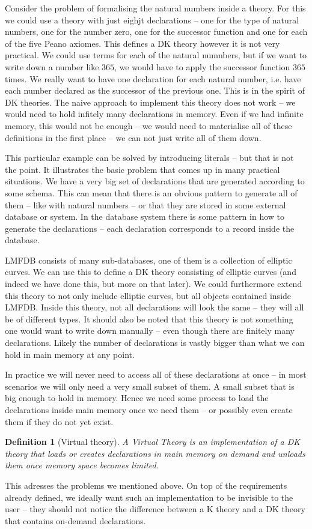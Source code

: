 \documentclass{deliverablereport}
\newtheorem{mydef}{Definition}
\begin{document}
Consider the problem of formalising the natural numbers inside a theory. For this we could use a theory with just eighjt declarations -- one for the type of natural numbers, one for the number zero, one for the successor function and one for each of the five Peano axiomes. This defines a DK theory however it is not very practical. We could use terms for each of the natural numnbers, but if we want to write down a number like $365$, we would have to apply the successor function $365$ times. We really want to have one declaration for each natural number, i.e. have each number declared as the successor of the previous one. This is in the spirit of DK theories. The naive approach to implement this theory does not work -- we would need to hold infitely many declarations in memory. Even if we had infinite memory, this would not be enough -- we would need to materialise all of these definitions in the first place -- we can not just write all of them down.

This particular example can be solved by introducing literals -- but that is not the point. It illustrates the basic problem that comes up in many practical situations. We have a very big set of declarations that are generated according to some schema. This can mean that there is an obvious pattern to generate all of them -- like with natural numbers -- or that they are stored in some external database or system. In the database system there is some pattern in how to generate the declarations -- each declaration corresponds to a record inside the database.

LMFDB consists of many sub-databases, one of them is a collection of elliptic curves. We can use this to define a DK theory consisting of elliptic curves (and indeed we have done this, but more on that later). We could furthermore extend this theory to not only include elliptic curves, but all objects contained inside LMFDB. Inside this theory, not all declarations will look the same -- they will all be of different types. It should also be noted that this theory is not something one would want to write down manually -- even though there are finitely many declarations. Likely the number of declarations is vastly bigger than what we can hold in main memory at any point.

In practice we will never need to access all of these declarations at once -- in most scenarios we will only need a very small subset of them. A small subset that is big enough to hold in memory. Hence we need some process to load the declarations inside main memory once we need them -- or possibly even create them if they do not yet exist.
\begin{mydef}[Virtual theory]
  A Virtual Theory is an implementation of a DK theory that loads or creates declarations in main memory on demand and unloads them once memory space becomes limited.
\end{mydef}
This adresses the problems we mentioned above. On top of the requirements already defined, we ideally want such an implementation to be invisible to the user -- they should not notice the difference between a K theory and a DK theory that contains on-demand declarations.
\end{document}
